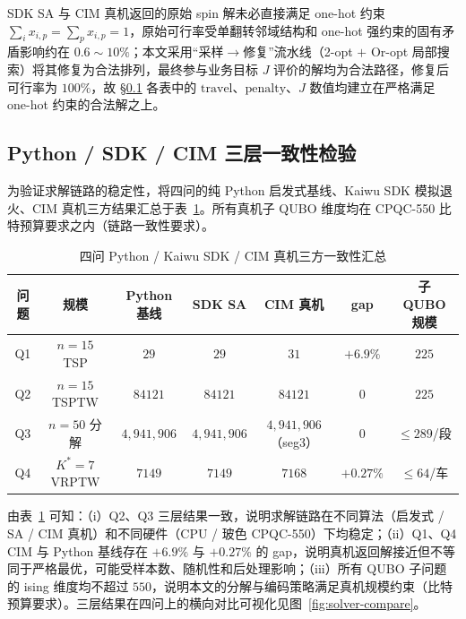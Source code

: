 \documentclass[UTF8,12pt,a4paper]{ctexart}
\begin{document}
SDK SA 与 CIM 真机返回的原始 spin 解未必直接满足 one-hot 约束 $\sum_i x_{i,p}\!=\!\sum_p x_{i,p}\!=\!1$，原始可行率受单翻转邻域结构和 one-hot 强约束的固有矛盾影响约在 $0.6\!\sim\!10\%$；本文采用``采样$\to$修复''流水线（2-opt $+$ Or-opt 局部搜索）将其修复为合法排列，最终参与业务目标 $J$ 评价的解均为合法路径，修复后可行率为 $100\%$，故 §\ref{sec:sens-cross} 各表中的 $\mathrm{travel}$、$\mathrm{penalty}$、$J$ 数值均建立在严格满足 one-hot 约束的合法解之上。

\subsection{Python / SDK / CIM 三层一致性检验}
\label{sec:sens-cross}

为验证求解链路的稳定性，将四问的纯 Python 启发式基线、Kaiwu SDK 模拟退火、CIM 真机三方结果汇总于表~\ref{tab:sens-cross}。所有真机子 QUBO 维度均在 CPQC-550 比特预算要求之内（链路一致性要求）。

\begin{table}[H]
    \centering
    \caption{四问 Python / Kaiwu SDK / CIM 真机三方一致性汇总}
    \label{tab:sens-cross}
    \footnotesize
    \begin{tabular}{ccccccc}
        \toprule
        问题 & 规模 & Python 基线 & SDK SA & CIM 真机 & gap & 子 QUBO 规模 \\
        \midrule
        Q1 & $n\!=\!15$ TSP    & $29$         & $29$         & $31$           & $+6.9\%$  & $225$ \\
        Q2 & $n\!=\!15$ TSPTW  & $84121$      & $84121$      & $84121$        & $0$       & $225$ \\
        Q3 & $n\!=\!50$ 分解   & $4{,}941{,}906$ & $4{,}941{,}906$ & $4{,}941{,}906$（seg3）& $0$ & $\le 289$/段 \\
        Q4 & $K^*\!=\!7$ VRPTW & $7149$       & $7149$       & $7168$         & $+0.27\%$ & $\le 64$/车 \\
        \bottomrule
    \end{tabular}
\end{table}

由表~\ref{tab:sens-cross} 可知：（i）Q2、Q3 三层结果一致，说明求解链路在不同算法（启发式 / SA / CIM 真机）和不同硬件（CPU / 玻色 CPQC-550）下均稳定；（ii）Q1、Q4 CIM 与 Python 基线存在 $+6.9\%$ 与 $+0.27\%$ 的 gap，说明真机返回解接近但不等同于严格最优，可能受样本数、随机性和后处理影响；（iii）所有 QUBO 子问题的 ising 维度均不超过 $550$，说明本文的分解与编码策略满足真机规模约束（比特预算要求）。三层结果在四问上的横向对比可视化见图~\ref{fig:solver-compare}。
\end{document}
